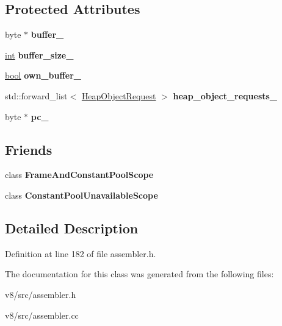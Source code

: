 \subsection*{Protected Attributes}
\begin{DoxyCompactItemize}
\item 
\mbox{\label{classv8_1_1internal_1_1AssemblerBase_ad344ab4ee5927986bb2c17e63aa5a976}} 
byte $\ast$ {\bfseries buffer\+\_\+}
\item 
\mbox{\label{classv8_1_1internal_1_1AssemblerBase_a83cced380ff671163b1969b2ed2aa33c}} 
\mbox{\hyperlink{classint}{int}} {\bfseries buffer\+\_\+size\+\_\+}
\item 
\mbox{\label{classv8_1_1internal_1_1AssemblerBase_a9ec9983a6ada967f6b1d03551b2615d2}} 
\mbox{\hyperlink{classbool}{bool}} {\bfseries own\+\_\+buffer\+\_\+}
\item 
\mbox{\label{classv8_1_1internal_1_1AssemblerBase_a1507b5f1d1c52d86fdae1b834c083462}} 
std\+::forward\+\_\+list$<$ \mbox{\hyperlink{classv8_1_1internal_1_1HeapObjectRequest}{Heap\+Object\+Request}} $>$ {\bfseries heap\+\_\+object\+\_\+requests\+\_\+}
\item 
\mbox{\label{classv8_1_1internal_1_1AssemblerBase_ae4d9536957f5e1b5336125b9c5c4d2f8}} 
byte $\ast$ {\bfseries pc\+\_\+}
\end{DoxyCompactItemize}
\subsection*{Friends}
\begin{DoxyCompactItemize}
\item 
\mbox{\label{classv8_1_1internal_1_1AssemblerBase_aa304fe9349eea268e71b1a8e1287d56e}} 
class {\bfseries Frame\+And\+Constant\+Pool\+Scope}
\item 
\mbox{\label{classv8_1_1internal_1_1AssemblerBase_a6eeae7aab06d03635ae81dd285ddd428}} 
class {\bfseries Constant\+Pool\+Unavailable\+Scope}
\end{DoxyCompactItemize}


\subsection{Detailed Description}


Definition at line 182 of file assembler.\+h.



The documentation for this class was generated from the following files\+:\begin{DoxyCompactItemize}
\item 
v8/src/assembler.\+h\item 
v8/src/assembler.\+cc\end{DoxyCompactItemize}
